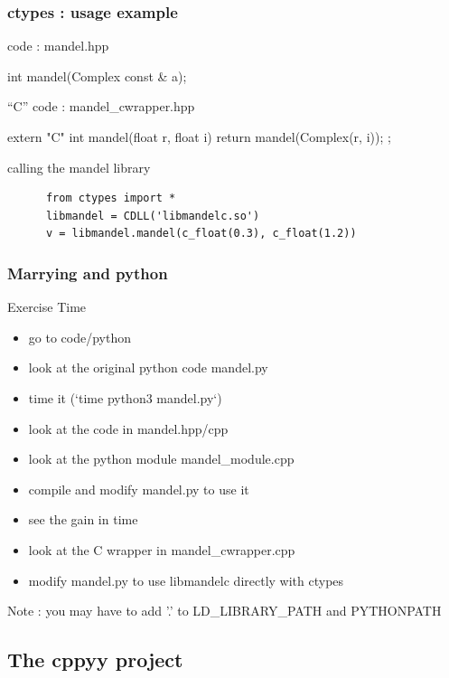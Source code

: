 \begin{frame}[fragile]
  \frametitle{ctypes : usage example}
  \begin{block}{\cpp code : mandel.hpp}
    \begin{cppcode*}{}
      int mandel(Complex const & a);
    \end{cppcode*}
  \end{block}
  \begin{block}{``C'' code : mandel\_cwrapper.hpp}
    \begin{cppcode*}{}
      extern "C" {
        int mandel(float r, float i) {
          return mandel(Complex(r, i));
        };
      }
    \end{cppcode*}
  \end{block}
  \begin{exampleblock}{calling the mandel library}
    \begin{verbatim}
      from ctypes import *
      libmandel = CDLL('libmandelc.so')
      v = libmandel.mandel(c_float(0.3), c_float(1.2))
    \end{verbatim}
  \end{exampleblock}
\end{frame}

\begin{frame}
  \frametitle{Marrying \cpp and python}
  \begin{alertblock}{Exercise Time}
    \begin{itemize}
    \item go to code/python
    \item look at the original python code mandel.py
    \item time it (`time python3 mandel.py`)
    \item look at the code in mandel.hpp/cpp
    \item look at the python module mandel\_module.cpp
    \item compile and modify mandel.py to use it
    \item see the gain in time
    \item look at the C wrapper in mandel\_cwrapper.cpp
    \item modify mandel.py to use libmandelc directly with ctypes
    \end{itemize}
  \end{alertblock}
  \tiny Note : you may have to add '.' to LD\_LIBRARY\_PATH and PYTHONPATH
\end{frame}

\subsection[cppyy]{The cppyy project}

